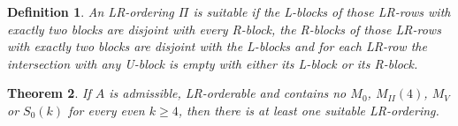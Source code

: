 \documentclass[12pt]{book}
\theoremstyle{plain}
\newtheorem{teo}{Theorem}[chapter]
\newtheorem{defn}[teo]{Definition}
\theoremstyle{remark}
\newtheorem{remark}[teo]{\textbf{\textit{Remark}}}
\begin{document}
\begin{defn} \label{def:suitable_ordering}
	An LR-ordering $\Pi$ is \emph{suitable} if the L-blocks of those LR-rows with exactly two blocks are disjoint with every R-block, the R-blocks of those LR-rows with exactly two blocks are disjoint with the L-blocks and for each LR-row the intersection with any U-block is empty with either its L-block or its R-block.
\end{defn} 


\begin{teo} \label{teo:hay_suitable_ordering}
If $A$ is admissible, LR-orderable and contains no $M_0$, $M_{II}(4)$, $M_V$ or $S_0(k)$ for every even $k \geq 4$, then there is at least one suitable LR-ordering. %
\end{teo} 
\end{document}
